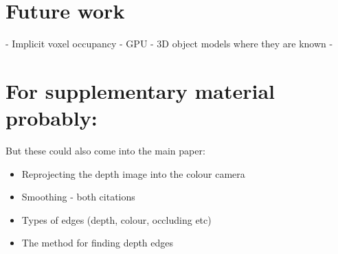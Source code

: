 \documentclass[10pt,twocolumn,letterpaper]{article}
\begin{document}

\section{Future work}

- Implicit voxel occupancy
- GPU
- 3D object models where they are known
- 

\section{For supplementary material probably:}
But these could also come into the main paper:
\begin{itemize}
\item Reprojecting the depth image into the colour camera
\item Smoothing - both citations
\item Types of edges (depth, colour, occluding etc)
\item The method for finding depth edges
\end{itemize}



{\small


}

\end{document}
